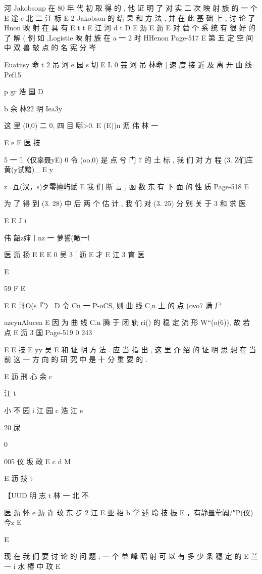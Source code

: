 {{{{河
Jakobsonp 在 80 年 代 初 取 得 的 , 他 证 明 了 对 实 二 次 映 射 族 的 一 个
E 途 c 北 二 江 标
E
2
Jakobson 的 结 果 和 方 法 , 并 在 此 基 础 上 , 讨 论 了 Hnon 映 射 在 具 有
E t t
E 江 河 d t
D
E 沥
E 沥 E
对 菪 个 系 统 有 很 好 的 了 解 ( 例 如 ,Logistie 映 射 族 在 a 一 2 时 HHenon
Page-517
E 第 五 定 空 间 中 双 兽 敲 点 的 名 宪 分 岑

Euatnsy 命 t 2 吊 河
e 园 s 切
E L 0 芸 河 吊 林命 |
速 度 接 近 及 离 开 曲 线 Pef15.

p gr 浩
国
D

b 余 林22 明 Iea3y

这 里 (0,0) 二 0, 四 目 哪>0. E (E))n
沥 伟 林 一

E e E
医 技

5 一 ′l〈仅辜聂yE) 0
令 (oo,0) 是 点 兮 门 7 的 土 标 , 我 们 对 方 程 (3. Z们庄黄(y试黯)_
E y

z=互(汊，s)歹零嬗屿赋 E
我 们 断 言 , 函 数 东 有 下 面 的 性 质
Page-518
E

为 了 得 到 (3. 28) 中 后 两 个 估 计 , 我 们 对 (3. 25) 分 别 关 于 3 和 求
医

E E
J
i

伟 韶z婶丨nz 一 萝誓(瞰一l

医 沥 扬 E E
E
0 吴 3 [ 沥
E 才
E 江 3 育
医

E

59 F E

E E
哥O(s『′〉 D
令 Cn 一 P-oCS, 则 曲 线 C,n 上 的 点 (ovo7 满 尸

azcynAlucea E
因 为 曲 线 C.n 腾 于 闭 轨 ri() 的 稳 定 流 形 W“(o(6)), 故 若 点
E 沥 3 国
Page-519
0 243

E
E 技
E yy 吴 E
和 证 明 方 法 . 应 当 指 出 , 这 里 介 绍 的 证 明 思 想 在 当 前 这 一 方 向 的 研
究 中 是 十 分 重 要 的 .

E 沥 刑 心 余 c

江
t

小 不 园 i 江 园 c 浩 江
e

20 尿

0

005 仪 坂 政 E c d M

E 沥 技 t

【UUD 明 志 t 林 一 北 不

医 沥 怀 e 沥 许 玟 东 步 2 江
E 亚 招
b 学 述 玲 技 振
E ，有静噩荤阗/″P(仪)今z E

E

现 在 我 们 要 讨 论 的 问 题 ; 一 个 单 峰 昭 射 可 以 有 多 少 条 穗 定 的
E 兰 一 i 水 椿 中
玟
E

}}}}
